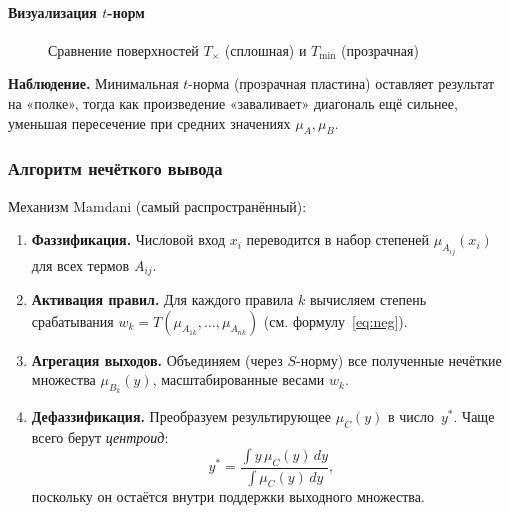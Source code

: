 \paragraph{Визуализация $t$-норм}

\begin{figure}[h]
\centering
{}
\caption{Сравнение поверхностей $T_{\times}$ (сплошная) и $T_{\min}$ (прозрачная)}
\label{fig:tnorm_surface}
\end{figure}

\noindent
\textbf{Наблюдение.}
Минимальная $t$-норма (прозрачная пластина)  
оставляет результат на «полке»,
тогда как произведение «заваливает» диагональ ещё сильнее,
уменьшая пересечение
при средних значениях $\mu_A,\mu_B$.

\subsubsection{Алгоритм нечёткого вывода}

Механизм Mamdani (самый распространённый):

\begin{enumerate}
  \item \textbf{Фаззификация.}  
        Числовой вход $x_i$ переводится
        в набор степеней $\mu_{A_{ij}}(x_i)$
        для всех термов $A_{ij}$.
  \item \textbf{Активация правил.}  
        Для каждого правила $k$ вычисляем
        степень срабатывания
        \(
          w_k = T(\mu_{A_{1k}},\dots,\mu_{A_{nk}})
        \)
        (см. формулу~\eqref{eq:neg}).
  \item \textbf{Агрегация выходов.}  
        Объединяем (через $S$-норму) все
        полученные нечёткие множества
        \(
          \mu_{B_k}(y)
        \),
        масштабированные весами $w_k$.
  \item \textbf{Дефаззификация.}  
        Преобразуем результирующее
        $\mu_C(y)$ в число~$y^\ast$.
        Чаще всего берут \emph{центроид}:
        \[
          y^\ast =
          \dfrac{\int y\,\mu_C(y)\,dy}{\int \mu_C(y)\,dy},
        \]
        поскольку он остаётся
        внутри поддержки выходного множества.
\end{enumerate}

